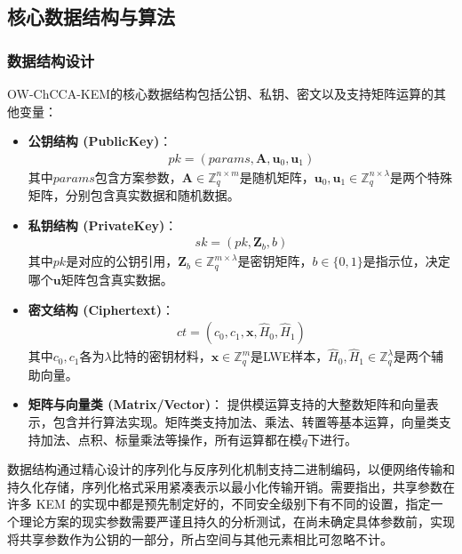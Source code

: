 \subsection{核心数据结构与算法}
\subsubsection{数据结构设计}

OW-ChCCA-KEM的核心数据结构包括公钥、私钥、密文以及支持矩阵运算的其他变量：

\begin{itemize}
    \item \textbf{公钥结构 (PublicKey)}：
    \begin{align}
    pk = (params, \mathbf{A}, \mathbf{u}_0, \mathbf{u}_1)
    \end{align}
    其中$params$包含方案参数，$\mathbf{A} \in \mathbb{Z}_q^{n \times m}$是随机矩阵，$\mathbf{u}_0, \mathbf{u}_1 \in \mathbb{Z}_q^{n \times \lambda}$是两个特殊矩阵，分别包含真实数据和随机数据。
    
    \item \textbf{私钥结构 (PrivateKey)}：
    \begin{align}
    sk = (pk, \mathbf{Z}_b, b)
    \end{align}
    其中$pk$是对应的公钥引用，$\mathbf{Z}_b \in \mathbb{Z}_q^{m \times \lambda}$是密钥矩阵，$b \in \{0,1\}$是指示位，决定哪个$\mathbf{u}$矩阵包含真实数据。
    
    \item \textbf{密文结构 (Ciphertext)}：
    \begin{align}
    ct = (c_0, c_1, \mathbf{x}, \hat{H}_0, \hat{H}_1)
    \end{align}
    其中$c_0, c_1$各为$\lambda$比特的密钥材料，$\mathbf{x} \in \mathbb{Z}_q^m$是LWE样本，$\hat{H}_0, \hat{H}_1 \in \mathbb{Z}_q^\lambda$是两个辅助向量。
    
    \item \textbf{矩阵与向量类 (Matrix/Vector)}：
    提供模运算支持的大整数矩阵和向量表示，包含并行算法实现。矩阵类支持加法、乘法、转置等基本运算，向量类支持加法、点积、标量乘法等操作，所有运算都在模$q$下进行。
\end{itemize}

数据结构通过精心设计的序列化与反序列化机制支持二进制编码，以便网络传输和持久化存储，序列化格式采用紧凑表示以最小化传输开销。需要指出，共享参数在许多 KEM 的实现中都是预先制定好的，不同安全级别下有不同的设置，指定一个理论方案的现实参数需要严谨且持久的分析测试，在尚未确定具体参数前，实现将共享参数作为公钥的一部分，所占空间与其他元素相比可忽略不计。


